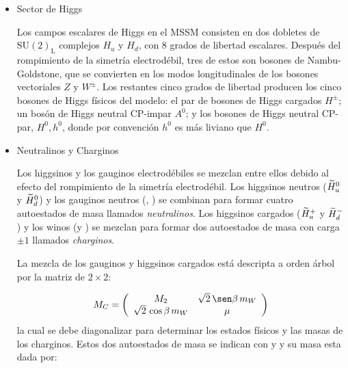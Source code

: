


\begin{itemize}\itemsep0.2cm\parskip0.2cm

\item Sector de Higgs

Los campos escalares de Higgs en el MSSM consisten en dos dobletes de
$\text{SU}(2)_\text{L}$ complejos $H_u$ y $H_d$, con 8 grados de libertad
escalares. Después del rompimiento de la simetría electrodébil, tres de estos
son bosones de Nambu-Goldstone, que se convierten en los modos longitudinales de
los bosones vectoriales $Z$ y $W^\pm$. Los restantes cinco grados de libertad
producen los cinco bosones de Higgs físicos del modelo: el par de bosones de
Higgs cargados $H^\pm$; un bosón de Higgs neutral CP-impar $A^0$; y los bosones
de Higgs neutral CP-par, $H^0,h^0$, donde por convención $h^0$ es más liviano
que $H^0$.


\item Neutralinos y Charginos %

Los higgsinos y los gauginos electrodébiles se mezclan entre ellos debido al
efecto del rompimiento de la simetría electrodébil. Los higgsinos neutros
($\widetilde{H}_u^0$ y $\widetilde{H}_d^0$) y los gauginos neutros (\bino, \winozero) se
combinan para formar cuatro autoestados de masa llamados \emph{neutralinos}.
Los higgsinos cargados ($\widetilde{H}_u^+$ y $\widetilde{H}_d^-$) y los winos (\winop y
\winom) se mezclan para formar dos autoestados de masa con carga $\pm 1$
llamados \emph{charginos}.

La mezcla de los gauginos y higgsinos cargados está descripta a orden árbol por la matriz de $2\times 2$:

\begin{equation}
  M_{C} = \left(
  \begin{array}{cc}
      M_2               & {\sqrt{2}} \, \sen \beta \, m_{W} \\
      \sqrt{2} \, \cos \beta \, m_W & \mu
  \end{array}
  \right)
\end{equation}
%
la cual se debe diagonalizar para determinar los estados físicos y las masas de los charginos.
Estos dos autoestados de masa se indican con {\chinoonepm} y
{\chinotwopm} y su masa esta dada por:


\end{itemize}

